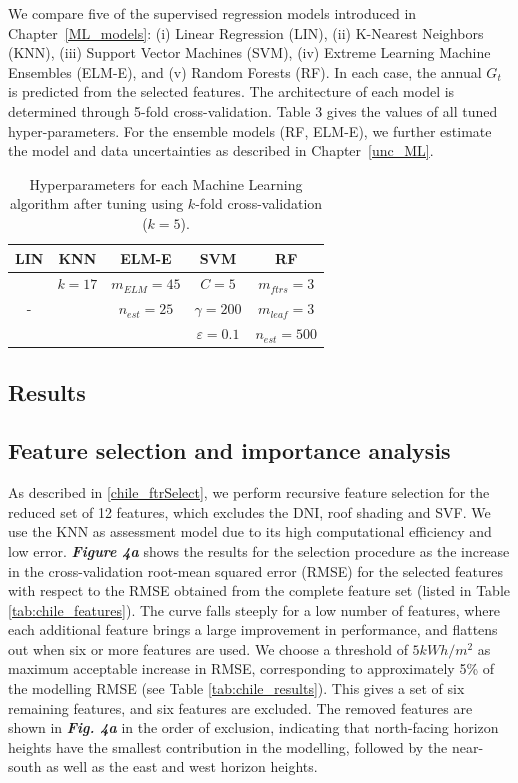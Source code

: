We compare five of the supervised regression models introduced in Chapter~\ref{ML_models}: (i) Linear Regression (LIN), (ii) K-Nearest Neighbors (KNN), (iii) Support Vector Machines (SVM), (iv) Extreme Learning Machine Ensembles (ELM-E), and (v) Random Forests (RF). In each case, the annual $G_t$ is predicted from the selected features. The architecture of each model is determined through 5-fold cross-validation. Table 3 gives the values of all tuned hyper-parameters. 
For the ensemble models (RF, ELM-E), we further estimate the model and data uncertainties as described in Chapter~\ref{unc_ML}.

\begin{table}[tb]
\centering
\footnotesize
\begin{tabular}{ccccc}
\hline
\textbf{LIN}       & \textbf{KNN}      & \textbf{ELM-E}     & \textbf{SVM}     & \textbf{RF}         \\\hline
\multirow{3}{*}{-} & $k = 17$   & $m_{ELM} = 45$ & $C = 5 $  & $m_{ftrs} = 3$  \\
                   & \multirow{2}{*}{} & $n_{est} = 25$ &  $\gamma = 200$ & $m_{leaf} = 3$  \\
                   &                   &                    & $\varepsilon = 0.1$ & $n_{est} = 500$\\
\hline
\end{tabular}
\caption{Hyperparameters for each Machine Learning algorithm after tuning using $k$-fold cross-validation ($k = 5$).}
\label{tab:chile_hyperparams}
\end{table}

\subsection{Results}

\subsection{Feature selection and importance analysis}

As described in \ref{chile_ftrSelect}, we perform recursive feature selection for the reduced set of 12 features, which excludes the DNI, roof shading and SVF. We use the KNN as assessment model due to its high computational efficiency and low error. \textbf{\textit{Figure 4a}} shows the results for the selection procedure as the increase in the cross-validation root-mean squared error (RMSE) for the selected features with respect to the RMSE obtained from the complete feature set (listed in Table \ref{tab:chile_features}). The curve falls steeply for a low number of features, where each additional feature brings a large improvement in performance, and flattens out when six or more features are used. We choose a threshold of $5 kWh/m^2$ as maximum acceptable increase in RMSE, corresponding to approximately 5\% of the modelling RMSE (see Table \ref{tab:chile_results}). This gives a set of six remaining features, and six features are excluded. The removed features are shown in \textbf{\textit{Fig. 4a}} in the order of exclusion, indicating that north-facing horizon heights have the smallest contribution in the modelling, followed by the near-south as well as the east and west horizon heights.

